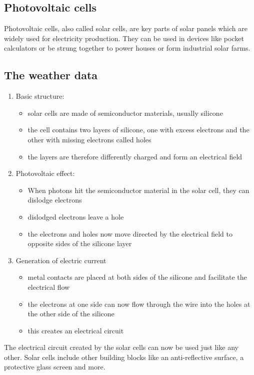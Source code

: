 \documentclass{article}
\begin{document}
\subsection{Photovoltaic cells}\label{sec:pv}

Photovoltaic cells, also called solar cells, are key parts of solar panels which are widely used for electricity production. They can be used in devices like pocket calculators or be strung together to power houses or form industrial solar farms.\\

\subsection{The weather data}

\begin{enumerate}
	\item Basic structure: \begin{itemize}
			\item solar cells are made of semiconductor materials, usually silicone
			\item the cell contains two layers of silicone, one with excess electrons and the other with missing electrons called holes
			\item the layers are therefore differently charged and form an electrical field
	\end{itemize}
	\item Photovoltaic effect: \begin{itemize}
		\item When photons hit the semiconductor material in the solar cell, they can dislodge electrons
		\item dislodged electrons leave a hole
		\item the electrons and holes now move directed by the electrical field to opposite sides of the silicone layer
	\end{itemize}
	\item Generation of electric current \begin{itemize}
		\item metal contacts are placed at both sides of the silicone and facilitate the electrical flow
		\item the electrons at one side can now flow through the wire into the holes at the other side of the silicone
		\item this creates an electrical circuit
	\end{itemize}
\end{enumerate}
The electrical circuit created by the solar cells can now be used just like any other. Solar cells include other building blocks like an anti-reflective surface, a protective glass screen and more. \citep{SolarCells}
\end{document}
